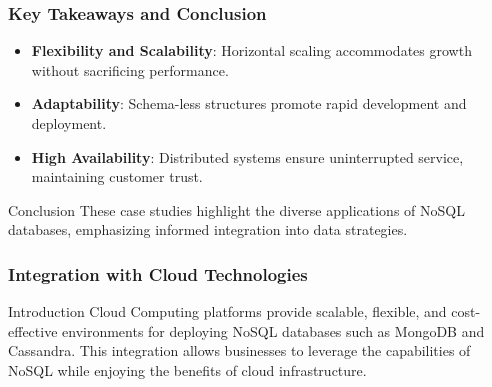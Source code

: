 \documentclass[aspectratio=169]{beamer}
\begin{document}
\begin{frame}[fragile]
  \frametitle{Key Takeaways and Conclusion}
  \begin{itemize}
    \item \textbf{Flexibility and Scalability}: Horizontal scaling accommodates growth without sacrificing performance.
    \item \textbf{Adaptability}: Schema-less structures promote rapid development and deployment.
    \item \textbf{High Availability}: Distributed systems ensure uninterrupted service, maintaining customer trust.
  \end{itemize}
  
  \begin{block}{Conclusion}
    These case studies highlight the diverse applications of NoSQL databases, emphasizing informed integration into data strategies.
  \end{block}
\end{frame}

\begin{frame}
    \frametitle{Integration with Cloud Technologies}
    \begin{block}{Introduction}
        Cloud Computing platforms provide scalable, flexible, and cost-effective environments for deploying NoSQL databases such as MongoDB and Cassandra. This integration allows businesses to leverage the capabilities of NoSQL while enjoying the benefits of cloud infrastructure.
    \end{block}
\end{frame}
\end{document}
